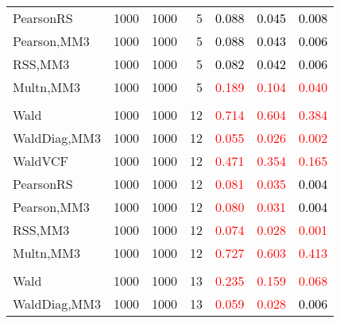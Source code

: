 \documentclass[
]{article}
\begin{document}
\begin{table}[H]
{\begin{tabular}[t]{lrrrrrr}
\hspace{1em}PearsonRS & 1000 & 1000 & 5 & \textcolor{black}{0.088} & \textcolor{black}{0.045} & \textcolor{black}{0.008}\\
\hspace{1em}Pearson,MM3 & 1000 & 1000 & 5 & \textcolor{black}{0.088} & \textcolor{black}{0.043} & \textcolor{black}{0.006}\\
\hspace{1em}RSS,MM3 & 1000 & 1000 & 5 & \textcolor{black}{0.082} & \textcolor{black}{0.042} & \textcolor{black}{0.006}\\
\hspace{1em}Multn,MM3 & 1000 & 1000 & 5 & \textcolor{red}{0.189} & \textcolor{red}{0.104} & \textcolor{red}{0.040}\\
\addlinespace[0.3em]
\multicolumn{7}{l}{\textbf{1F 15V}}\\
\hspace{1em}Wald & 1000 & 1000 & 12 & \textcolor{red}{0.714} & \textcolor{red}{0.604} & \textcolor{red}{0.384}\\
\hspace{1em}WaldDiag,MM3 & 1000 & 1000 & 12 & \textcolor{red}{0.055} & \textcolor{red}{0.026} & \textcolor{red}{0.002}\\
\hspace{1em}WaldVCF & 1000 & 1000 & 12 & \textcolor{red}{0.471} & \textcolor{red}{0.354} & \textcolor{red}{0.165}\\
\hspace{1em}PearsonRS & 1000 & 1000 & 12 & \textcolor{red}{0.081} & \textcolor{red}{0.035} & \textcolor{black}{0.004}\\
\hspace{1em}Pearson,MM3 & 1000 & 1000 & 12 & \textcolor{red}{0.080} & \textcolor{red}{0.031} & \textcolor{black}{0.004}\\
\hspace{1em}RSS,MM3 & 1000 & 1000 & 12 & \textcolor{red}{0.074} & \textcolor{red}{0.028} & \textcolor{red}{0.001}\\
\hspace{1em}Multn,MM3 & 1000 & 1000 & 12 & \textcolor{red}{0.727} & \textcolor{red}{0.603} & \textcolor{red}{0.413}\\
\addlinespace[0.3em]
\multicolumn{7}{l}{\textbf{2F 10V}}\\
\hspace{1em}Wald & 1000 & 1000 & 13 & \textcolor{red}{0.235} & \textcolor{red}{0.159} & \textcolor{red}{0.068}\\
\hspace{1em}WaldDiag,MM3 & 1000 & 1000 & 13 & \textcolor{red}{0.059} & \textcolor{red}{0.028} & \textcolor{black}{0.006}\\

\end{tabular}}
\end{table}
\end{document}
